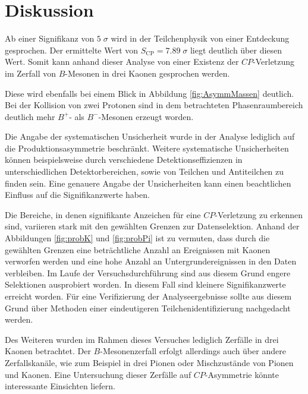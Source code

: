 \section{Diskussion}
Ab einer Signifikanz von $5\;\sigma$ wird in der Teilchenphysik von einer Entdeckung gesprochen. Der ermittelte Wert von $ S_\mathrm{CP} = 7.89\;\sigma$ liegt deutlich über diesen Wert. Somit kann anhand dieser Analyse von einer Existenz der $CP$-Verletzung im Zerfall von $B$-Mesonen in drei Kaonen gesprochen werden.

Diese wird ebenfalls bei einem Blick in Abbildung \ref{fig:AsymmMassen} deutlich. Bei der Kollision von zwei Protonen sind in dem betrachteten Phasenraumbereich deutlich mehr $B^{+}$- als $B^{-}$-Mesonen erzeugt worden.

Die Angabe der systematischen Unsicherheit wurde in der Analyse lediglich auf die Produktionsasymmetrie beschränkt. Weitere systematische Unsicherheiten können beispielsweise durch verschiedene Detektionseffizienzen in unterschiedlichen Detektorbereichen, sowie von Teilchen und Antiteilchen zu finden sein. Eine genauere Angabe der Unsicherheiten kann einen beachtlichen Einfluss auf die Signifikanzwerte haben.

Die Bereiche, in denen signifikante Anzeichen für eine $CP$-Verletzung zu erkennen sind, variieren stark mit den gewählten Grenzen zur Datenselektion. Anhand der Abbildungen \ref{fig:probK} und \ref{fig:probPi} ist zu vermuten, dass durch die gewählten Grenzen eine beträchtliche Anzahl an Ereignissen mit Kaonen verworfen werden und eine hohe Anzahl an Untergrundereignissen in den Daten verbleiben. Im Laufe der Versuchsdurchführung sind aus diesem Grund engere Selektionen ausprobiert worden. In diesem Fall sind kleinere Signifikanzwerte erreicht worden. 
Für eine Verifizierung der Analyseergebnisse sollte aus diesem Grund über Methoden einer eindeutigeren Teilchenidentifizierung nachgedacht werden. 

Des Weiteren wurden im Rahmen dieses Versuches lediglich Zerfälle in drei Kaonen betrachtet. Der $B$-Mesonenzerfall erfolgt allerdings auch über andere Zerfallskanäle, wie zum Beispiel in drei Pionen oder Mischzustände von Pionen und Kaonen. Eine Untersuchung dieser Zerfälle auf $CP$-Asymmetrie könnte interessante Einsichten liefern.